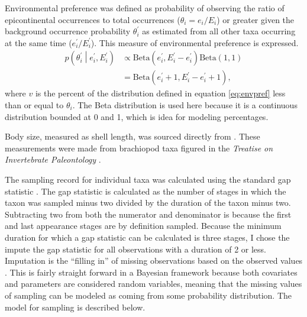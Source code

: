 \documentclass{article}
\begin{document}
Environmental preference was defined as probability of observing the ratio of epicontinental occurrences to total occurrences (\(\theta_{i} = e_{i} / E_{i}\)) or greater given the background occurrence probability \(\theta^{\prime}_{i}\) as estimated from all other taxa occurring at the same time (\(e^{\prime}_{i} / E^{\prime}_{i}\)). This measure of environmental preference is expressed.
\begin{equation*}
  \begin{aligned}
    p\left(\theta^{\prime}_{i} \middle| e^{\prime}_{i}, E^{\prime}_{i} \right) &\propto \mathrm{Beta}(e^{\prime}_{i}, E^{\prime}_{i} - e^{\prime}_{i}) \mathrm{Beta}(1, 1) \\
    &= \mathrm{Beta}(e^{\prime}_{i} + 1, E^{\prime}_{i} - e^{\prime}_{i} + 1),
  \end{aligned}
  \label{eq:envpref}
\end{equation*}
where \(v\) is the percent of the distribution defined in equation \ref{eq:envpref} less than or equal to \(\theta_{i}\). The Beta distribution is used here because it is a continuous distribution bounded at 0 and 1, which is idea for modeling percentages.

Body size, measured as shell length, was sourced directly from \citet{Payne2014}. These measurements were made from brachiopod taxa figured in the \textit{Treatise on Invertebrate Paleontology} \citep{Brunton2007}.

The sampling record for individual taxa was calculated using the standard gap statistic \citep{Foote1996e,Foote2000}. The gap statistic is calculated as the number of stages in which the taxon was sampled minus two divided by the duration of the taxon minus two. Subtracting two from both the numerator and denominator is because the first and last appearance stages are by definition sampled. Because the minimum duration for which a gap statistic can be calculated is three stages, I chose the impute the gap statistic for all observations with a duration of 2 or less. Imputation is the ``filling in'' of missing observations based on the observed values \citep{Gelman2007}. This is fairly straight forward in a Bayesian framework because both covariates and parameters are considered random variables, meaning that the missing values of sampling can be modeled as coming from some probability distribution. The model for sampling is described below.
\end{document}
